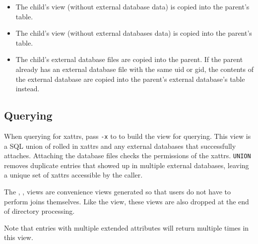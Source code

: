 \begin{itemize}
\item The child's \xattrsavail view (without external database data)
  is copied into the parent's \xattrsrollup table.
\item The child's \xattrfiles view (without external databases data)
  is copied into the parent's \xattrfilesrollup table.
\item The child's external database files are copied into the
  parent. If the parent already has an external database file with the
  same uid or gid, the contents of the external database are copied
  into the parent's external database's \xattrsrollup table instead.
\end{itemize}

\subsection{Querying}
When querying for xattrs, pass \texttt{-x} to \gufiquery to build the
\xattrs view for querying. This view is a SQL union of rolled in
xattrs and any external databases that successfully
attaches. Attaching the database files checks the permissions of the
xattrs. \texttt{UNION} removes duplicate entries that showed up in
multiple external databases, leaving a unique set of xattrs accessible
by the caller.

The \xentries, \xpentries, \xsummary views are convenience views
generated so that users do not have to perform joins themselves. Like
the \xattrs view, these views are also dropped at the end of directory
processing.

Note that entries with multiple extended attributes will return
multiple times in this view.
